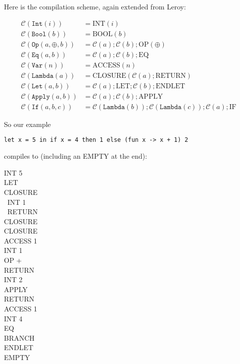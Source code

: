 \documentclass[11pt]{article}
\begin{document}
\noindent Here is the compilation scheme, again extended from Leroy:

\begin{align*}
\mathcal{C}(\texttt{Int}(i)) &= \text{INT}(i)\\
\mathcal{C}(\texttt{Bool}(b)) &= \text{BOOL}(b)\\
\mathcal{C}(\texttt{Op}(a, \oplus, b)) &= \mathcal{C}(a); \mathcal{C}(b); \text{OP}(\oplus)\\
\mathcal{C}(\texttt{Eq}(a, b)) &= \mathcal{C}(a); \mathcal{C}(b); \text{EQ}\\
\mathcal{C}(\texttt{Var}(n)) &= \text{ACCESS}(n)\\
\mathcal{C}(\texttt{Lambda}(a)) &= \text{CLOSURE}(\mathcal{C}(a); \text{RETURN})\\
\mathcal{C}(\texttt{Let}(a, b)) &= \mathcal{C}(a); \text{LET}; \mathcal{C}(b); \text{ENDLET}\\
\mathcal{C}(\texttt{Apply}(a, b)) &= \mathcal{C}(a); \mathcal{C}(b); \text{APPLY}\\
\mathcal{C}(\texttt{If}(a, b, c)) &= \mathcal{C}(\texttt{Lambda}(b)); \mathcal{C}(\texttt{Lambda}(c)); \mathcal{C}(a); \text{IF}
\end{align*}

\noindent So our example


\medskip
\noindent\texttt{let x = 5 in if x = 4 then 1 else (fun x -> x + 1) 2}
\medskip


\noindent compiles to (including an EMPTY at the end):

\medskip

\noindent INT 5\\
LET\\
CLOSURE\\
\phantom{\ \ }\ INT 1\\
\phantom{\ \ }\ RETURN\\
CLOSURE\\
\phantom{\ \ } CLOSURE\\
\phantom{\ \ \ \ } ACCESS 1\\
\phantom{\ \ \ \ } INT 1\\
\phantom{\ \ \ \ } OP +\\
\phantom{\ \ \ \ } RETURN\\
\phantom{\ \ } INT 2\\
\phantom{\ \ } APPLY\\
\phantom{\ \ } RETURN\\
ACCESS 1\\
INT 4\\
EQ\\
BRANCH\\
ENDLET\\
EMPTY
\end{document}
